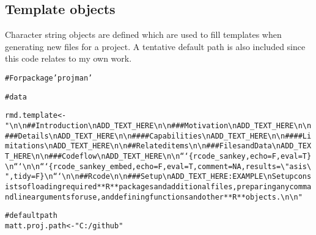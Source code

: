 \documentclass{article}\usepackage[]{graphicx}\usepackage[]{color}
\makeatletter
\newcommand{\hlstr}[1]{\textcolor[rgb]{0.863,0.196,0.184}{#1}}%
\newcommand{\hlcom}[1]{\textcolor[rgb]{0.345,0.431,0.459}{#1}}%
\newcommand{\hlstd}[1]{\textcolor[rgb]{0.514,0.58,0.588}{#1}}%
\newcommand{\hlkwb}[1]{\textcolor[rgb]{0.522,0.6,0}{#1}}%
\newenvironment{kframe}{%
 \def\at@end@of@kframe{}%
 \ifinner\ifhmode%
  \def\at@end@of@kframe{\end{minipage}}%
  \begin{minipage}{\columnwidth}%
 \fi\fi%
 \def\FrameCommand##1{\hskip\@totalleftmargin \hskip-\fboxsep
 \colorbox{shadecolor}{##1}\hskip-\fboxsep
     \hskip-\linewidth \hskip-\@totalleftmargin \hskip\columnwidth}%
 \MakeFramed {\advance\hsize-\width
   \@totalleftmargin\z@ \linewidth\hsize
   \@setminipage}}%
 {\par\unskip\endMakeFramed%
 \at@end@of@kframe}
\newenvironment{knitrout}{}{} %
\makeatother
\begin{document}
\title{}
\author{}
\maketitle





\subsection{Template objects}
Character string objects are defined which are used to fill templates when generating new files for a project.
A tentative default path is also included since this code relates to my own work.

\begin{knitrout}
\color{fgcolor}\begin{kframe}
\begin{alltt}
\hlcom{# For package 'projman'}

\hlcom{# data}

\hlstd{rmd.template} \hlkwb{<-} \hlstr{"\textbackslash{}n\textbackslash{}n## Introduction\textbackslash{}nADD_TEXT_HERE\textbackslash{}n\textbackslash{}n### Motivation\textbackslash{}nADD_TEXT_HERE\textbackslash{}n\textbackslash{}n### Details\textbackslash{}nADD_TEXT_HERE\textbackslash{}n\textbackslash{}n#### Capabilities\textbackslash{}nADD_TEXT_HERE\textbackslash{}n\textbackslash{}n#### Limitations\textbackslash{}nADD_TEXT_HERE\textbackslash{}n\textbackslash{}n## Related items\textbackslash{}n\textbackslash{}n### Files and Data\textbackslash{}nADD_TEXT_HERE\textbackslash{}n\textbackslash{}n### Code flow\textbackslash{}nADD_TEXT_HERE\textbackslash{}n\textbackslash{}n```\{r code_sankey, echo=F, eval=T\}\textbackslash{}n```\textbackslash{}n\textbackslash{}n```\{r code_sankey_embed, echo=F, eval=T, comment=NA, results=\textbackslash{}"asis\textbackslash{}", tidy=F\}\textbackslash{}n```\textbackslash{}n\textbackslash{}n## R code\textbackslash{}n\textbackslash{}n### Setup\textbackslash{}nADD_TEXT_HERE: EXAMPLE\textbackslash{}nSetup consists of loading required **R** packages and additional files, preparing any command line arguments for use, and defining functions and other **R** objects.\textbackslash{}n\textbackslash{}n"}

\hlcom{# default path}
\hlstd{matt.proj.path} \hlkwb{<-} \hlstr{"C:/github"}
\end{alltt}
\end{kframe}
\end{knitrout}
\end{document}
